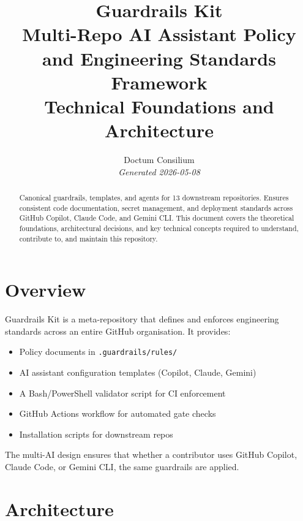 \documentclass[11pt,a4paper]{article}
\begin{document}
\title{
  \textcolor{doctum}{\Large\textbf{Guardrails Kit}} \\[0.5em]
  \large Multi-Repo AI Assistant Policy and Engineering Standards Framework \\[0.3em]
  \normalsize Technical Foundations and Architecture
}
\author{Doctum Consilium \\ \small\textit{Generated 2026-05-08}}
\date{}
\maketitle
\thispagestyle{fancy}

\begin{abstract}
Canonical guardrails, templates, and agents for 13 downstream repositories. Ensures consistent code documentation, secret management, and deployment standards across GitHub Copilot, Claude Code, and Gemini CLI.
This document covers the theoretical foundations, architectural decisions,
and key technical concepts required to understand, contribute to, and
maintain this repository.
\end{abstract}

\tableofcontents
\newpage

\section{Overview}

Guardrails Kit is a meta-repository that defines and enforces engineering standards
across an entire GitHub organisation. It provides:
\begin{itemize}
  \item Policy documents in \texttt{.guardrails/rules/}
  \item AI assistant configuration templates (Copilot, Claude, Gemini)
  \item A Bash/PowerShell validator script for CI enforcement
  \item GitHub Actions workflow for automated gate checks
  \item Installation scripts for downstream repos
\end{itemize}
The multi-AI design ensures that whether a contributor uses GitHub Copilot,
Claude Code, or Gemini CLI, the same guardrails are applied.


\section{Architecture}
\end{document}
